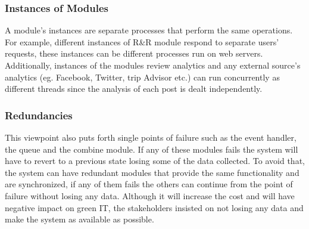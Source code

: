 \subsubsection{Instances of Modules}

A module's instances are separate processes that perform the same operations. For example, different instances of R\&R module respond to separate users' requests, these instances can be different processes run on web servers. Additionally, instances of the modules review analytics and any external source's analytics (eg. Facebook, Twitter, trip Advisor etc.) can run concurrently as different threads since the analysis of each post is dealt independently.

\subsubsection{Redundancies}

This viewpoint also puts forth single points of failure such as the event handler, the queue and the combine module. If any of these modules fails the system will have to revert to a previous state losing some of the data collected. To avoid that, the system can have redundant modules that provide the same functionality and are synchronized, if any of them fails the others can continue from the point of failure without losing any data. Although it will increase the cost and will have negative impact on green IT, the stakeholders insisted on not losing any data and make the system as available as possible.
